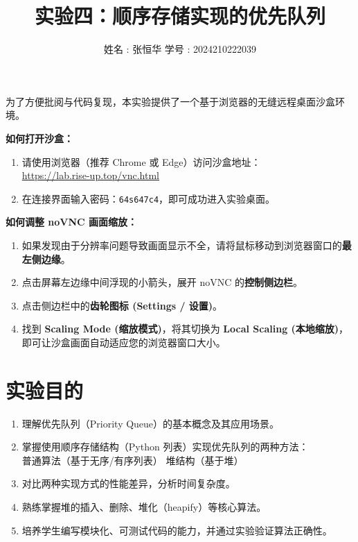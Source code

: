 \documentclass[12pt,a4paper]{ctexart}
\title{\vspace{-2cm} \textbf{实验四：顺序存储实现的优先队列}}
\author{姓名 : 张恒华 \quad 学号 : 2024210222039}
\begin{document}
	
	\maketitle
	
	\begin{tcolorbox}[colback=gray!5,colframe=gray!50!black,title=\textbf{实验复现沙盒使用提示}]
		为了方便批阅与代码复现，本实验提供了一个基于浏览器的无缝远程桌面沙盒环境。
		
		\textbf{如何打开沙盒：}
		\begin{enumerate}
			\item 请使用浏览器（推荐 Chrome 或 Edge）访问沙盒地址：\\
			\url{https://lab.rise-up.top/vnc.html}
			\item 在连接界面输入密码：\texttt{64s647c4}，即可成功进入实验桌面。
		\end{enumerate}
		
		\textbf{如何调整 noVNC 画面缩放：}
		\begin{enumerate}
			\item 如果发现由于分辨率问题导致画面显示不全，请将鼠标移动到浏览器窗口的\textbf{最左侧边缘}。
			\item 点击屏幕左边缘中间浮现的小箭头，展开 noVNC 的\textbf{控制侧边栏}。
			\item 点击侧边栏中的\textbf{齿轮图标 (Settings / 设置)}。
			\item 找到 \textbf{Scaling Mode (缩放模式)}，将其切换为 \textbf{Local Scaling (本地缩放)}，即可让沙盒画面自动适应您的浏览器窗口大小。
		\end{enumerate}
	\end{tcolorbox}
	
	\vspace{1em}
	
	\section{实验目的}
	\begin{enumerate}
		\item 理解优先队列（Priority Queue）的基本概念及其应用场景。
		\item 掌握使用顺序存储结构（Python 列表）实现优先队列的两种方法：\\
		普通算法（基于无序/有序列表）
		堆结构（基于堆）
		\item 对比两种实现方式的性能差异，分析时间复杂度。
		\item 熟练掌握堆的插入、删除、堆化（heapify）等核心算法。
		\item 培养学生编写模块化、可测试代码的能力，并通过实验验证算法正确性。
	\end{enumerate}
	
\end{document}
